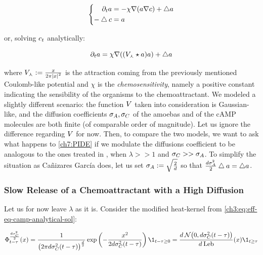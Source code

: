 \begin{equation}\label{conc:ANA-macro-amoebas}
	\left\{
	\begin{aligned}
		\partial_t a &= - \chi \nabla (a \nabla c) + \bigtriangleup a
		\\
		-\bigtriangleup c &= a
	\end{aligned}
	\right.
\end{equation}

or, solving $c_t$ analytically:

\begin{equation}\label{conc:ANA-macro-amoebas-in-1-equation}
		\partial_t a =  \chi \nabla ( (V_\curlywedge \star a) a) + \bigtriangleup a
\end{equation}

where $V_\curlywedge:= \frac{x}{2\pi \left| x \right|^2}$ is the attraction coming from the previously mentioned Coulomb-like potential and $\chi$ is the \emph{chemosensitivity}, namely a positive constant indicating the sensibility of the organisms to the chemoattractant.
We modeled a slightly different scenario: the function $V$ taken into consideration is Gaussian-like, and the diffusion coefficients $\sigma_A, \sigma_C$ of the amoebas and of the cAMP molecules are both finite (\ie of comparable order of magnitude).
Let us ignore the difference regarding $V$ for now.
Then, to compare the two models, we want to ask what happens to \ref{ch7:PIDE} if we modulate the diffusions coefficient to be analogous to the ones treated in \cite{ana}, \ie when $\lambda >> 1$ and $\sigma_C >> \sigma_A$.
To simplify the situation as Cañizares García does, let us set $\sigma_A := \sqrt{\frac{2}{d}}$ so that $\frac{d\sigma_A^2}{2} \bigtriangleup a = \bigtriangleup a$.

\subsubsection{Slow Release of a Chemoattractant with a High Diffusion}

Let us for now leave $\lambda$ as it is.
Consider the modified heat-kernel from \ref{ch3:eq:eff-eq-camp-analytical-sol}:

\begin{equation*}
	\heatkernel_{t-\tau}^{\frac{d\sigma_\camp^2}{2}}(x) 
	= 
	\frac{1}{
		\big( 2\pi d\sigma_\camp^2 (t-\tau) \big)^{\frac{d}{2}}
	}
	\exp \left(
	-\frac{x^2}{2 d\sigma_\camp^2 (t-\tau)}
	\right)
	\1_{t-\tau\geq 0} 
	= 
	\frac{d\: \Normal\big( 0, d\sigma_\camp^2 (t-\tau) \big)}{d\:\lebsge} (x)
	\1_{t\geq \tau} 
\end{equation*}

